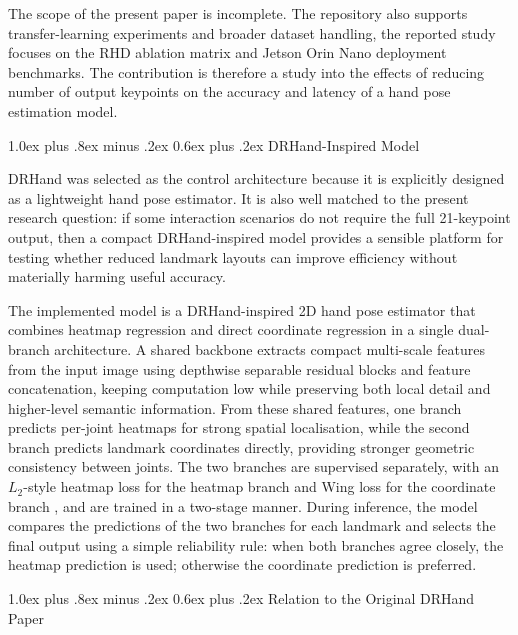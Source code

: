 \documentclass[10pt,letterpaper,twocolumn]{article}
\makeatletter
\renewcommand\subsection{\@startsection{subsection}{2}{\z@}%
  {1.0ex plus .8ex minus .2ex}%
  {0.6ex plus .2ex}%
  {\normalfont\itshape}}
\makeatother
\begin{document}
The scope of the present paper is incomplete. The repository also supports transfer-learning experiments and broader dataset handling, the reported study focuses on the RHD ablation matrix and Jetson Orin Nano deployment benchmarks. The contribution is therefore a study into the effects of reducing number of output keypoints on the accuracy and latency of a hand pose estimation model.

\subsection{DRHand-Inspired Model}

DRHand was selected as the control architecture because it is explicitly designed as a lightweight hand pose estimator. It is also well matched to the present research question: if some interaction scenarios do not require the full 21-keypoint output, then a compact DRHand-inspired model provides a sensible platform for testing whether reduced landmark layouts can improve efficiency without materially harming useful accuracy.

The implemented model is a DRHand-inspired 2D hand pose estimator that combines heatmap regression and direct coordinate regression in a single dual-branch architecture. A shared backbone extracts compact multi-scale features from the input image using depthwise separable residual blocks and feature concatenation, keeping computation low while preserving both local detail and higher-level semantic information. From these shared features, one branch predicts per-joint heatmaps for strong spatial localisation, while the second branch predicts landmark coordinates directly, providing stronger geometric consistency between joints. The two branches are supervised separately, with an $L_2$-style heatmap loss for the heatmap branch and Wing loss for the coordinate branch \cite{wingloss}, and are trained in a two-stage manner. During inference, the model compares the predictions of the two branches for each landmark and selects the final output using a simple reliability rule: when both branches agree closely, the heatmap prediction is used; otherwise the coordinate prediction is preferred.

\subsection{Relation to the Original DRHand Paper}
\end{document}
